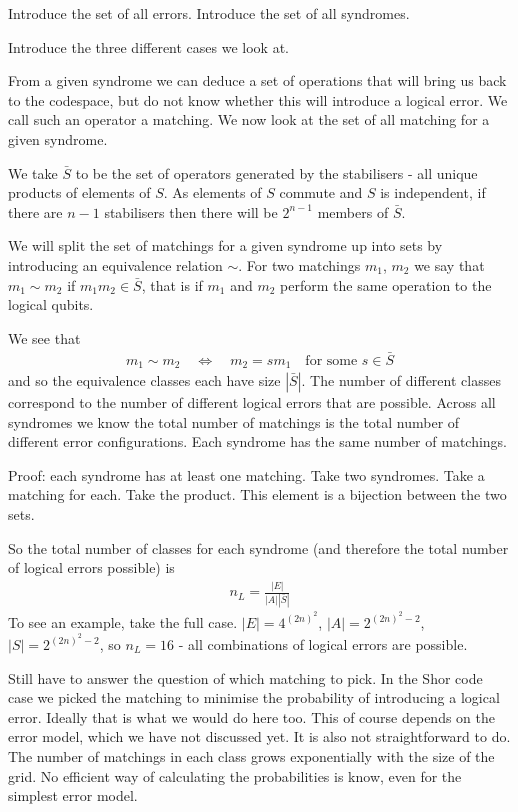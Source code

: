 Introduce the set of all errors. Introduce the set of all syndromes.

Introduce the three different cases we look at. 

From a given syndrome we can deduce a set of operations that will bring us back to the codespace, but do not know whether this will introduce a logical error. We call such an operator a matching. We now look at the set of all matching for a given syndrome.

We take $\bar{S}$ to be the set of operators generated by the stabilisers - all unique products of elements of $S$. As elements of $S$ commute and $S$ is independent, if there are $n-1$ stabilisers then there will be $2^{n-1}$ members of $\bar{S}$.

We will split the set of matchings for a given syndrome up into sets by introducing an equivalence relation $\sim$. For two matchings $m_1$, $m_2$ we say that $m_1 \sim m_2$ if $m_1m_2 \in \bar{S}$, that is if $m_1$ and $m_2$ perform the same operation to the logical qubits. 

We see that
\begin{align}
  m_1 \sim m_2 \quad \Leftrightarrow \quad m_2 = sm_1 \quad \text{for some $s\in\bar{S}$}
\end{align}
and so the equivalence classes each have size $|\bar{S}|$. The number of different classes correspond to the number of different logical errors that are possible. Across all syndromes we know the total number of matchings is the total number of different error configurations. Each syndrome has the same number of matchings.

Proof: each syndrome has at least one matching. Take two syndromes. Take a matching for each. Take the product. This element is a bijection between the two sets.

So the total number of classes for each syndrome (and therefore the total number of logical errors possible) is
\begin{align}
  n_L = \frac{|E|}{|A||\bar{S}|}
\end{align}
To see an example, take the full case. $|E| = 4^{(2n)^2}$, $|A| = 2^{(2n)^2-2}$, $|S| = 2^{(2n)^2 - 2}$, so $n_L = 16$ - all combinations of logical errors are possible.


Still have to answer the question of which matching to pick. In the Shor code case we picked the matching to minimise the probability of introducing a logical error. Ideally that is what we would do here too. This of course depends on the error model, which we have not discussed yet. It is also not straightforward to do. The number of matchings in each class grows exponentially with the size of the grid. No efficient way of calculating the probabilities is know, even for the simplest error model.

